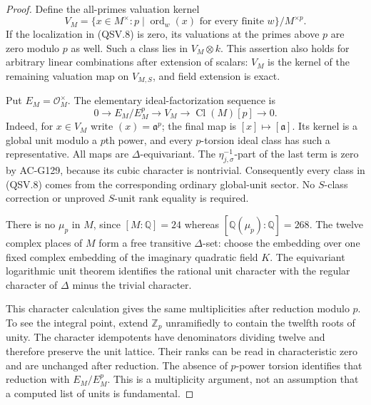 \begin{proof}
Define the all-primes valuation kernel
\[
 V_M=\{x\in M^\times:
          p\mid\operatorname{ord}_w(x)
              \text{ for every finite }w\}/M^{\times p}.
 \tag{QSV.9}
\]
If the localization in (QSV.8) is zero, its valuations at the
primes above \(p\) are zero modulo \(p\) as well.  Such a class
lies in \(V_M\otimes k\).  This assertion also holds for arbitrary
linear combinations after extension of scalars: \(V_M\) is the
kernel of the remaining valuation map on \(V_{M,S}\), and field
extension is exact.

Put \(E_M=\mathcal O_M^\times\).  The elementary ideal-factorization
sequence is
\[
       0\longrightarrow E_M/E_M^p
        \longrightarrow V_M
        \longrightarrow\operatorname{Cl}(M)[p]
        \longrightarrow0.
 \tag{QSV.10}
\]
Indeed, for \(x\in V_M\) write \((x)=\mathfrak a^p\);
the final map is \([x]\mapsto[\mathfrak a]\).  Its kernel is a
global unit modulo a \(p\)th power, and every \(p\)-torsion ideal
class has such a representative.  All maps are \(\Delta\)-equivariant.
The \(\eta_{j,\sigma}^{-1}\)-part of the last term is zero by
AC-G129, because its cubic character is nontrivial.
Consequently every class in (QSV.8) comes from the corresponding
ordinary global-unit sector.  No \(S\)-class correction or
unproved \(S\)-unit rank equality is required.

There is no \(\mu_p\) in \(M\), since \([M:\mathbb Q]=24\) whereas
\([\mathbb Q(\mu_p):\mathbb Q]=268\).
The twelve complex places of \(M\) form a free transitive
\(\Delta\)-set: choose the embedding over one fixed complex
embedding of the imaginary quadratic field \(K\).
The equivariant logarithmic unit theorem identifies the rational
unit character with the regular character of \(\Delta\) minus
the trivial character.

This character calculation gives the same multiplicities after
reduction modulo \(p\).  To see the integral point, extend
\(\mathbb Z_p\) unramifiedly to contain the twelfth roots of unity.
The character idempotents have denominators dividing twelve and
therefore preserve the unit lattice.  Their ranks can be read in
characteristic zero and are unchanged after reduction.  The
absence of \(p\)-power torsion identifies that reduction with
\(E_M/E_M^p\).  This is a multiplicity argument, not an assumption
that a computed list of units is fundamental.


\end{proof}

